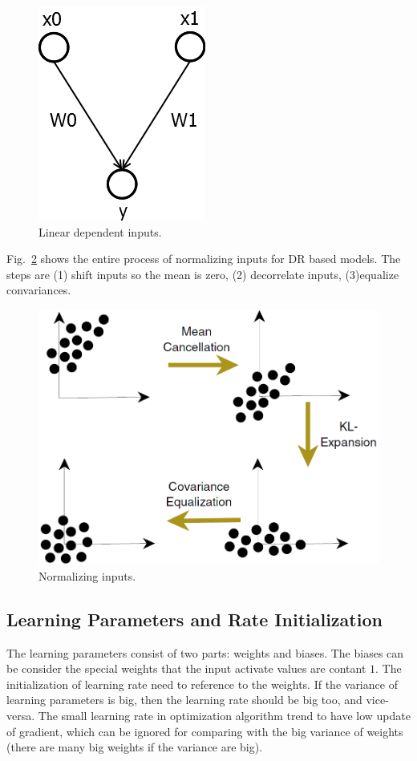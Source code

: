 \documentclass[runningheads,openany]{xhlPaper}
\begin{document}
\begin{figure}
\centering
\includegraphics[width=0.5\linewidth]{normalizing_input_decorrelated}
\caption{Linear dependent inputs.}
\label{fig:normalizing_input_decorrelated}
\end{figure}

Fig.~\ref{fig:normalizing_input_processing} shows the entire process of normalizing inputs for DR based models. The steps are (1) shift inputs so the mean is zero, (2) decorrelate inputs, (3)equalize convariances.

\begin{figure}
\centering
\includegraphics[width=0.5\linewidth]{normalizing_input_processing}
\caption{Normalizing inputs.}
\label{fig:normalizing_input_processing}
\end{figure}

\subsection{Learning Parameters and Rate Initialization}
\label{sec:mlp_learning_parameter_initialization}
The learning parameters consist of two parts: weights and biases.
The biases can be consider the special weights that the input activate values are contant $1$.
The initialization of learning rate need to reference to the weights.
If the variance of learning parameters is big, then the learning rate should be big too, and vice-versa.
The small learning rate in optimization algorithm trend to have low update of gradient, which can be ignored for comparing with the big variance of weights (there are many big weights if the variance are big).
\end{document}
